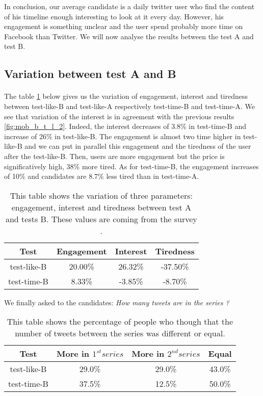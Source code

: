 In conclusion, our average candidate is a daily twitter user who find the content of his timeline enough interesting to look at it every day. However, his engagement is something unclear and the user spend probably more time on Facebook than Twitter. We will now analyse the results between the test A and test B.


\subsection{Variation between test A and B}

\paragraph{}
The table \ref{tab:surv_var}  below gives us the variation of engagement, interest and tiredness between test-like-B and test-like-A respectively test-time-B and test-time-A. We see that variation of the interest is in agreement with the previous results \ref{fig:mob_b_t_l_2}. Indeed, the interest decreases of 3.8\% in test-time-B and increase of 26\% in test-like-B. The engagement is almost two time higher in test-like-B and we can put in parallel this engagement and the tiredness of the user after the test-like-B. Then, users are more engagement but the price is significatively high, 38\% more tired. As for test-time-B, the engagement increases of 10\% and candidates are 8.7\% less tired than in test-time-A.

\begin{table}[h]
\centering
\begin{tabular}{cccc}
\toprule
Test & Engagement & Interest & Tiredness \\ 
\midrule
test-like-B & 20.00\% & 26.32\% & -37.50\% \\
test-time-B & 8.33\% & -3.85\% & -8.70\%\\
\bottomrule 
\end{tabular}
\caption[Survey - variation]{This table shows the variation of three parameters: engagement, interest and tiredness between test A and tests B. These values are coming from the survey \cite{Survey_g}. }
\label{tab:surv_var}
\end{table}

We finally asked to the candidates: \textit{How many tweets are in the series ?}\\ 

\begin{table}[h]
\centering
\begin{tabular}{cccc}
\toprule
Test & More in $1^{st} series$ & More in $2^{nd} series$ & Equal \\ 
\midrule
test-like-B & 29.0\% & 29.0\% & 43.0\% \\
test-time-B & 37.5\% & 12.5\% & 50.0\%\\
\bottomrule 
\end{tabular}
\caption[Survey - number of tweets]{This table shows the percentage of people who though that the number of tweets between the series was different or equal.}
\label{tab:more_tweets}
\end{table}

